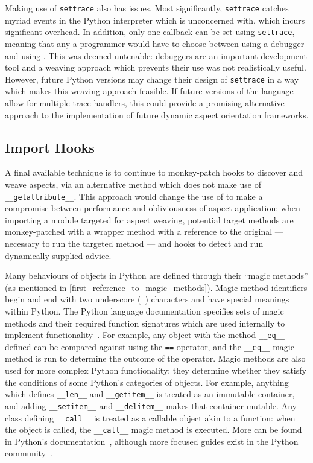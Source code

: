 Making use of \lstinline{settrace} also has issues. Most significantly,
\lstinline{settrace} catches myriad events in the Python interpreter which
\pdsf{} is unconcerned with, which incurs significant overhead. In addition,
only one callback can be set using \lstinline{settrace}, meaning that any a
programmer would have to choose between using a debugger and using \pdsf{}. This
was deemed untenable: debuggers are an important development tool and a weaving
approach which prevents their use was not realistically useful. However, future
Python versions may change their design of \lstinline{settrace} in a way which
makes this weaving approach feasible. If future versions of the language allow
for multiple trace handlers, this could provide a promising alternative approach
to the implementation of future dynamic aspect orientation frameworks.


\subsection{Import Hooks}\label{subsec:pdsf3importhookdiscussion}

A final available technique is to continue to monkey-patch hooks to discover and
weave aspects, via an alternative method which does not make use of
\lstinline{__getattribute__}. This approach would change the use of \pdsf{} to
make a compromise between performance and obliviousness of aspect application:
when importing a module targeted for aspect weaving, potential target methods
are monkey-patched with a wrapper method with a reference to the original ---
necessary to run the targeted method --- and hooks to detect and run dynamically
supplied advice.

Many behaviours of objects in Python are defined through their ``magic
methods'' (as mentioned in \cref{first_reference_to_magic_methods}). Magic method
identifiers begin and end with two underscore (\lstinline{_}) characters and
have special meanings within Python. The Python language documentation specifies
sets of magic methods and their required function signatures which are used
internally to implement functionality~\cite{py3docs}. For example, any object
with the method \lstinline{__eq__} defined can be compared against using the
\lstinline{==} operator, and the \lstinline{__eq__} magic method is run to
determine the outcome of the operator. Magic methods are also used for more
complex Python functionality: they determine whether they satisfy the conditions
of some Python's categories of objects. For example, anything which defines
\lstinline{__len__} and \lstinline{__getitem__} is treated as an immutable
container, and adding \lstinline{__setitem__} and \lstinline{__delitem__} makes
that container mutable. Any class defining \lstinline{__call__} is treated as a
callable object akin to a function: when the object is called, the
\lstinline{__call__} magic method is executed. More can be found in Python's
documentation~\cite{py3docs}, although more focused guides exist in the Python
community~\cite{magicmethodguide}.

